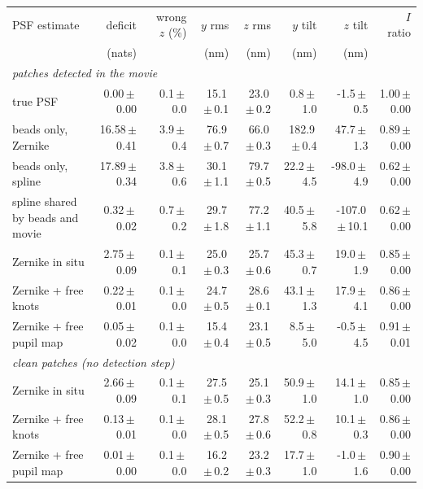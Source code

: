 \begin{tabular}{lrrrrrrr}\toprule
PSF estimate & deficit & wrong $z$ (\%) & $y$ rms & $z$ rms & $y$ tilt & $z$ tilt & $I$ ratio\\
 & (nats) & & (nm) & (nm) & (nm) & (nm) & \\ \midrule
\multicolumn{8}{l}{\emph{patches detected in the movie}}\\
true PSF & 0.00\,$\pm$\,0.00 & 0.1\,$\pm$\,0.0 & 15.1\,$\pm$\,0.1 & 23.0\,$\pm$\,0.2 & 0.8\,$\pm$\,1.0 & -1.5\,$\pm$\,0.5 & 1.00\,$\pm$\,0.00\\
beads only, Zernike & 16.58\,$\pm$\,0.41 & 3.9\,$\pm$\,0.4 & 76.9\,$\pm$\,0.7 & 66.0\,$\pm$\,0.3 & 182.9\,$\pm$\,0.4 & 47.7\,$\pm$\,1.3 & 0.89\,$\pm$\,0.00\\
beads only, spline & 17.89\,$\pm$\,0.34 & 3.8\,$\pm$\,0.6 & 30.1\,$\pm$\,1.1 & 79.7\,$\pm$\,0.5 & 22.2\,$\pm$\,4.5 & -98.0\,$\pm$\,4.9 & 0.62\,$\pm$\,0.00\\
spline shared by beads and movie & 0.32\,$\pm$\,0.02 & 0.7\,$\pm$\,0.2 & 29.7\,$\pm$\,1.8 & 77.2\,$\pm$\,1.1 & 40.5\,$\pm$\,5.8 & -107.0\,$\pm$\,10.1 & 0.62\,$\pm$\,0.00\\
Zernike in situ & 2.75\,$\pm$\,0.09 & 0.1\,$\pm$\,0.1 & 25.0\,$\pm$\,0.3 & 25.7\,$\pm$\,0.6 & 45.3\,$\pm$\,0.7 & 19.0\,$\pm$\,1.9 & 0.85\,$\pm$\,0.00\\
Zernike + free knots & 0.22\,$\pm$\,0.01 & 0.1\,$\pm$\,0.0 & 24.7\,$\pm$\,0.5 & 28.6\,$\pm$\,0.1 & 43.1\,$\pm$\,1.3 & 17.9\,$\pm$\,4.1 & 0.86\,$\pm$\,0.00\\
Zernike + free pupil map & 0.05\,$\pm$\,0.02 & 0.1\,$\pm$\,0.0 & 15.4\,$\pm$\,0.4 & 23.1\,$\pm$\,0.5 & 8.5\,$\pm$\,5.0 & -0.5\,$\pm$\,4.5 & 0.91\,$\pm$\,0.01\\
\multicolumn{8}{l}{\emph{clean patches (no detection step)}}\\
Zernike in situ & 2.66\,$\pm$\,0.09 & 0.1\,$\pm$\,0.1 & 27.5\,$\pm$\,0.5 & 25.1\,$\pm$\,0.3 & 50.9\,$\pm$\,1.0 & 14.1\,$\pm$\,1.0 & 0.85\,$\pm$\,0.00\\
Zernike + free knots & 0.13\,$\pm$\,0.01 & 0.1\,$\pm$\,0.0 & 28.1\,$\pm$\,0.5 & 27.8\,$\pm$\,0.6 & 52.2\,$\pm$\,0.8 & 10.1\,$\pm$\,0.3 & 0.86\,$\pm$\,0.00\\
Zernike + free pupil map & 0.01\,$\pm$\,0.00 & 0.1\,$\pm$\,0.0 & 16.2\,$\pm$\,0.2 & 23.2\,$\pm$\,0.3 & 17.7\,$\pm$\,1.0 & -1.0\,$\pm$\,1.6 & 0.90\,$\pm$\,0.00\\
\bottomrule\end{tabular}